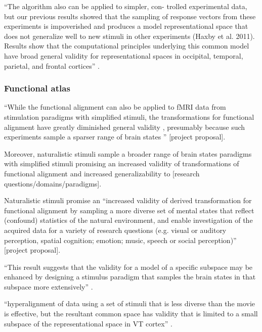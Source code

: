 ``The algorithm also can be applied to simpler, con- trolled experimental data,
but our previous results showed that the sampling of response vectors from these
experiments is impoverished and produces a model representational space that
does not generalize well to new stimuli in other experiments (Haxby et al.
2011). Results show that the computational principles underlying this common
model have broad general validity for representational spaces in occipital,
temporal, parietal, and frontal cortices'' \citep{guntupalli2016model}.



\subsubsection{Functional atlas}



%
``While the functional alignment can also be applied to fMRI data from
stimulation paradigms with simplified stimuli, the transformations for
functional alignment have greatly diminished general validity
\citep{haxby2011common}, presumably because such experiments sample a sparser
range of brain states \citep{guntupalli2016model}'' [project proposal].

%
Moreover, naturalistic stimuli sample a broader range of brain states paradigms
with simplified stimuli \citep{guntupalli2016model, haxby2011common} promising
an increased validity of transformations of functional alignment and increased
generalizability to [research questions/domains/paradigms].

%
Naturalistic stimuli promise an ``increased validity of derived transformation
for functional alignment by sampling a more diverse set of mental states that
reflect (confound) statistics of the natural environment, and enable
investigation of the acquired data for a variety of research questions (e.g.
visual or auditory perception, spatial cognition; emotion; music, speech or
social perception)'' [project proposal].

``This result suggests that the validity for a model of a specific subspace may
be enhanced by designing a stimulus paradigm that samples the brain states in
that subspace more extensively'' \citep{haxby2011common}.

``hyperalignment of data using a set of stimuli that is less diverse than the
movie is effective, but the resultant common space has validity that is limited
to a small subspace of the representational space in VT cortex''
\citep{haxby2011common}.

